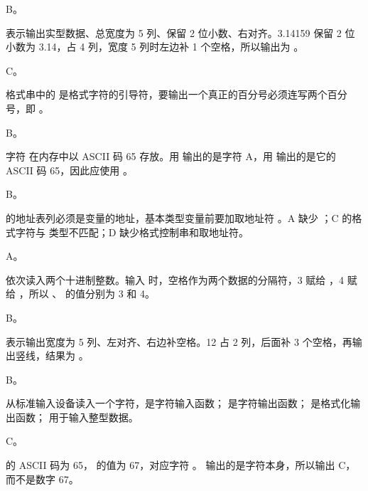 \documentclass[a4paper,11pt]{article}
\begin{document}


\q B。\begin{analysis} 表示输出实型数据、总宽度为 5 列、保留 2 位小数、右对齐。3.14159 保留 2 位小数为 3.14，占 4 列，宽度 5 列时左边补 1 个空格，所以输出为 。\end{analysis}

\q C。\begin{analysis}格式串中的 \code{\%} 是格式字符的引导符，要输出一个真正的百分号必须连写两个百分号，即 \code{\%\%}。\end{analysis}

\q B。\begin{analysis}字符  在内存中以 ASCII 码 65 存放。用  输出的是字符 A，用  输出的是它的 ASCII 码 65，因此应使用 。\end{analysis}

\q B。\begin{analysis} 的地址表列必须是变量的地址，基本类型变量前要加取地址符 \code{\&}。A 缺少 \code{\&}；C 的格式字符与  类型不匹配；D 缺少格式控制串和取地址符。\end{analysis}

\q A。\begin{analysis} 依次读入两个十进制整数。输入  时，空格作为两个数据的分隔符，3 赋给 ，4 赋给 ，所以 、 的值分别为 3 和 4。\end{analysis}

\q B。\begin{analysis} 表示输出宽度为 5 列、左对齐、右边补空格。12 占 2 列，后面补 3 个空格，再输出竖线，结果为 。\end{analysis}

\q B。\begin{analysis} 从标准输入设备读入一个字符，是字符输入函数； 是字符输出函数； 是格式化输出函数； 用于输入整型数据。\end{analysis}

\q C。\begin{analysis} 的 ASCII 码为 65， 的值为 67，对应字符 。 输出的是字符本身，所以输出 C，而不是数字 67。\end{analysis}
\end{document}

